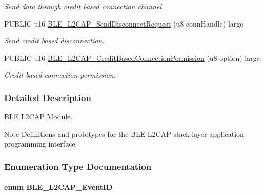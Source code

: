 \begin{DoxyCompactItemize}
\begin{DoxyCompactList}\small\item\em Send data through credit based connection channel. \end{DoxyCompactList}\item 
P\+U\+B\+L\+IC u16 \hyperlink{group___b_l_e___l2_c_a_p_gabd09b737f0f1fbf25d3d2eb12663e134}{B\+L\+E\+\_\+\+L2\+C\+A\+P\+\_\+\+Send\+Disconnect\+Request} (u8 conn\+Handle) large
\begin{DoxyCompactList}\small\item\em Send credit based disconnection. \end{DoxyCompactList}\item 
P\+U\+B\+L\+IC u16 \hyperlink{group___b_l_e___l2_c_a_p_gad53baaece261a4d5f2cced5346c3eab9}{B\+L\+E\+\_\+\+L2\+C\+A\+P\+\_\+\+Credit\+Based\+Connection\+Permission} (u8 option) large
\begin{DoxyCompactList}\small\item\em Credit based connection permission. \end{DoxyCompactList}\end{DoxyCompactItemize}


\subsubsection{Detailed Description}
B\+LE L2\+C\+AP Module. 

\begin{DoxyNote}{Note}
Definitions and prototypes for the B\+LE L2\+C\+AP stack layer application programming interface. 
\end{DoxyNote}


\subsubsection{Enumeration Type Documentation}
\paragraph[{\texorpdfstring{B\+L\+E\+\_\+\+L2\+C\+A\+P\+\_\+\+Event\+ID}{BLE_L2CAP_EventID}}]{\setlength{\rightskip}{0pt plus 5cm}enum {\bf B\+L\+E\+\_\+\+L2\+C\+A\+P\+\_\+\+Event\+ID}}\hypertarget{group___b_l_e___l2_c_a_p_gab22309c032161491ea67caafd08d5535}{}\label{group___b_l_e___l2_c_a_p_gab22309c032161491ea67caafd08d5535}


